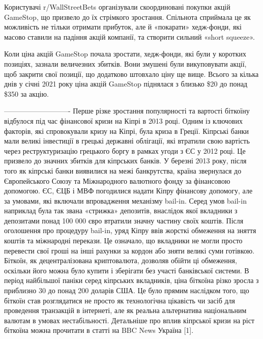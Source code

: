 \documentclass[12pt]{report}
\begin{document}
Користувачі r/WallStreetBets організували скоординовані покупки акцій GameStop, що призвело до їх стрімкого зростання. Спільнота сприймала це як можливість не тільки отримати прибуток, але й «покарати» хедж-фонди, які масово ставили на падіння акцій компанії, та створити сильний «short squeeze».

Коли ціна акцій GameStop почала зростати, хедж-фонди, які були у коротких позиціях, зазнали величезних збитків. Вони змушені були викуповувати акції, щоб закрити свої позиції, що додатково штовхало ціну ще вище. Всього за кілька днів у січні 2021 року ціна акцій GameStop піднялася з близько \$20 до понад \$350 за акцію.



----------------------------
Перше різке зростання популярності та вартості біткоїну відбулося під час фінансової кризи на Кіпрі в 2013 році. Одним із ключових факторів, які спровокували кризу на Кіпрі, була криза в Греції. Кіпрські банки мали великі інвестиції в грецькі державні облігації, які втратили свою вартість через реструктуризацію грецького боргу в рамках угоди з ЄС у 2012 році. Це призвело до значних збитків для кіпрських банків. У березні 2013 року, після того як кіпрські банки виявилися на межі банкрутства, країна звернулася до Європейського Союзу та Міжнародного валютного фонду за фінансовою допомогою. ЄС, ЄЦБ і МВФ погодилися надати Кіпру фінансову допомогу, але за умовами, які включали впровадження механізму bail-in. Серед умов bail-in наприклад була так звана «стрижка» депозитів, внаслідок якої вкладники з депозитами понад 100 000 євро втратили значну частину своїх коштів. Після оголошення про процедуру bail-in, уряд Кіпру ввів жорсткі обмеження на зняття коштів та міжнародні перекази. Це означало, що вкладники не могли просто перевести свої гроші на інші рахунки за кордон або зняти великі суми готівкою. Біткоїн, як децентралізована криптовалюта, дозволяв обійти ці обмеження, оскільки його можна було купити і зберігати без участі банківської системи. В період найбільшої паніки серед кіпрських вкладників, ціна біткоїна різко зросла з приблизно 30 до понад 200 доларів США. Це було прямим наслідком того, що біткоїн став розглядатися не просто як технологічна цікавість чи засіб для проведення транзакцій в інтернеті, але як реальна альтернатива національним валютам в умовах нестабільності. Детальніше про вплив кіпрської кризи на ріст біткоїна можна прочитати в статті на BBC News Україна [1].
\end{document}
